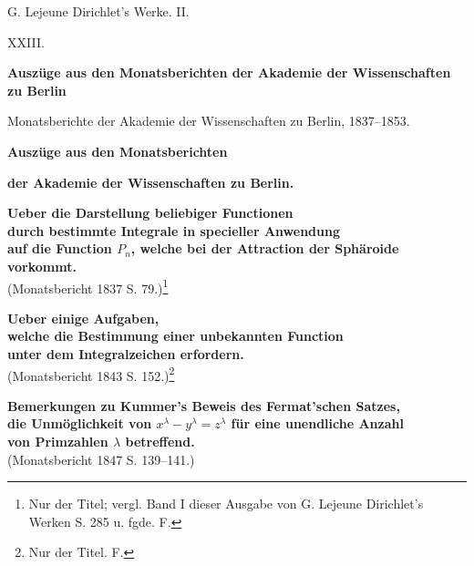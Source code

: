 \documentclass[11pt]{article}
\begin{document}
\begin{center}
{\Large G. Lejeune Dirichlet's Werke. II.}\par\vspace{1.2em}
{\Large XXIII.}\par\vspace{0.5em}
{\LARGE \textbf{Auszüge aus den Monatsberichten der Akademie der Wissenschaften zu Berlin}}\par\vspace{1em}
{\small Monatsberichte der Akademie der Wissenschaften zu Berlin, 1837--1853.}
\end{center}

\bigskip
\begin{center}
{\Large \textbf{Auszüge aus den Monatsberichten}}\par
{\Large \textbf{der Akademie der Wissenschaften zu Berlin.}}
\end{center}

\bigskip
\begin{center}
{\large \textbf{Ueber die Darstellung beliebiger Functionen}}\\
{\large \textbf{durch bestimmte Integrale in specieller Anwendung}}\\
{\large \textbf{auf die Function $P_n$, welche bei der Attraction der Sphäroide}}\\
{\large \textbf{vorkommt.}}\\
{\small (Monatsbericht 1837 S. 79.)\footnote{Nur der Titel; vergl. Band I dieser Ausgabe von G. Lejeune Dirichlet's Werken S. 285 u. fgde. \textnormal{F.}}}
\end{center}

\vspace{2em}
\begin{center}
{\large \textbf{Ueber einige Aufgaben,}}\\
{\large \textbf{welche die Bestimmung einer unbekannten Function}}\\
{\large \textbf{unter dem Integralzeichen erfordern.}}\\
{\small (Monatsbericht 1843 S. 152.)\footnote{Nur der Titel. \textnormal{F.}}}
\end{center}

\newpage
\begin{center}
{\large \textbf{Bemerkungen zu Kummer's Beweis des Fermat'schen Satzes,}}\\
{\large \textbf{die Unmöglichkeit von $x^\lambda-y^\lambda=z^\lambda$ für eine unendliche Anzahl}}\\
{\large \textbf{von Primzahlen $\lambda$ betreffend.}}\\
{\small (Monatsbericht 1847 S. 139--141.)}
\end{center}
\end{document}

